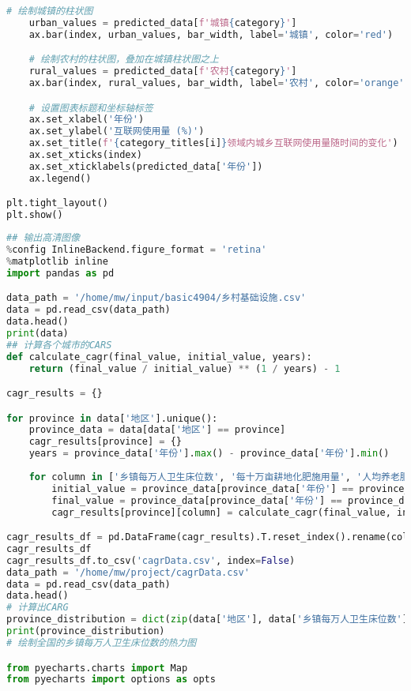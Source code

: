 \begin{lstlisting}[language=python,caption={城乡互联网}]
    # 绘制城镇的柱状图
    urban_values = predicted_data[f'城镇{category}']
    ax.bar(index, urban_values, bar_width, label='城镇', color='red')

    # 绘制农村的柱状图，叠加在城镇柱状图之上
    rural_values = predicted_data[f'农村{category}']
    ax.bar(index, rural_values, bar_width, label='农村', color='orange', bottom=urban_values)

    # 设置图表标题和坐标轴标签
    ax.set_xlabel('年份')
    ax.set_ylabel('互联网使用量 (%)')
    ax.set_title(f'{category_titles[i]}领域内城乡互联网使用量随时间的变化')
    ax.set_xticks(index)
    ax.set_xticklabels(predicted_data['年份'])
    ax.legend()

plt.tight_layout()
plt.show()
\end{lstlisting}

\begin{lstlisting}[language=python,caption={基础设施}]
## 输出高清图像
%config InlineBackend.figure_format = 'retina'
%matplotlib inline
import pandas as pd

data_path = '/home/mw/input/basic4904/乡村基础设施.csv'
data = pd.read_csv(data_path)
data.head()
print(data)
## 计算各个城市的CARS
def calculate_cagr(final_value, initial_value, years):
    return (final_value / initial_value) ** (1 / years) - 1

cagr_results = {}

for province in data['地区'].unique():
    province_data = data[data['地区'] == province]
    cagr_results[province] = {}
    years = province_data['年份'].max() - province_data['年份'].min()
    
    for column in ['乡镇每万人卫生床位数', '每十万亩耕地化肥施用量', '人均养老服务机构数量']:
        initial_value = province_data[province_data['年份'] == province_data['年份'].min()][column].values[0]
        final_value = province_data[province_data['年份'] == province_data['年份'].max()][column].values[0]
        cagr_results[province][column] = calculate_cagr(final_value, initial_value, years)

cagr_results_df = pd.DataFrame(cagr_results).T.reset_index().rename(columns={'index': '地区'})
cagr_results_df
cagr_results_df.to_csv('cagrData.csv', index=False)
data_path = '/home/mw/project/cagrData.csv'
data = pd.read_csv(data_path)
data.head()
# 计算出CARG
province_distribution = dict(zip(data['地区'], data['乡镇每万人卫生床位数']))
print(province_distribution)
# 绘制全国的乡镇每万人卫生床位数的热力图

from pyecharts.charts import Map
from pyecharts import options as opts


\end{lstlisting}
